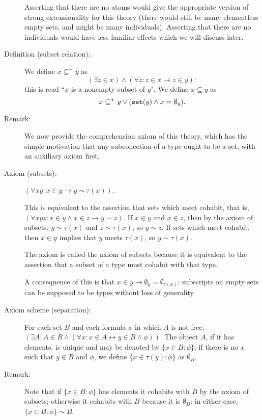 \documentclass[12pt]{article}
\begin{document}
\begin{description}
Asserting that there are no atoms would give the appropriate version of strong extensionality for this theory (there would still be many elementless empty sets, and might be many individuals).  Asserting that there are no individuals would have less familiar effects which we will discuss later.

\item[Definition (subset relation):]  We define $x \subseteq^+ y$ as $$(\exists z \in x) \wedge (\forall z:z \in x \rightarrow z \in y):$$ this is read ``$x$ is a nonempty subset of $y$".   We define $x \subseteq y$ as $$x \subseteq^+ y \vee ({\tt set}(y) \wedge x = \emptyset_y).$$

\item[Remark:]  We now provide the comprehension axiom of this theory, which has the simple motivation that any subcollection of a type ought to be a set, with an auxiliary axiom first.

\item[Axiom (subsets):]  $(\forall xy:x \in y \rightarrow y \sim \tau(x))$.  

This is equivalent to the assertion that sets which meet cohabit, that is, $(\forall xyz:x \in y \wedge x \in z \rightarrow y \sim z)$.  If $x \in y$ and $x \in z$, then by the axiom of subsets, $y \sim \tau(x)$ and $z \sim \tau(x)$, so $y \sim z$.  If sets which meet cohabit, then $x \in y$ implies that $y$ meets $\tau(x)$, so $y \sim \tau(x)$.

The axiom is called the axiom of subsets because it is equivalent to the assertion that a subset of a type must cohabit with that type.

A consequence of this is that $x \in y \rightarrow \emptyset_y = \emptyset_{\tau(x)}$:  subscripts on empty sets can be supposed to be types without loss of generality.

\item[Axiom scheme (separation):]  For each set $B$ and each formula $\phi$ in which $A$ is not free, $(\exists A:A \in B \wedge (\forall x:x \in A \leftrightarrow y \in B\wedge \phi))$.  The object $A$, if it has elements, is unique and may be denoted by $\{x \in B:\phi\}$; if there is no $x$ such that $y \in B$ and $\phi$, we define $\{x \in \tau(y):\phi\}$ as
$\emptyset_{B}$.

\item[Remark:]  Note that if $\{x \in B:\phi\}$ has elements it cohabits with $B$ by the axiom of subsets; otherwise it cohabits with $B$ because it is $\emptyset_B$:  in either case, $\{x \in B:\phi\} \sim B$.


\end{description}
\end{document}
